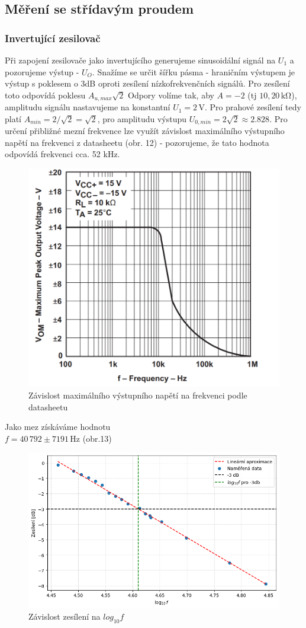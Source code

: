 \documentclass[czech,11pt,a4paper]{article}
\begin{document}
\begin{multicols}{2}
		\subsection{Měření se střídavým proudem}
		\subsubsection{Invertující zesilovač}
		Při zapojení zesilovače jako invertujícího generujeme sinusoidální signál na $U_1$ a pozorujeme výstup - $U_O$. Snažíme se určit šířku pásma - hraničním výstupem je výstup s poklesem o 3dB oproti zesílení nízkofrekvenčních signálů. Pro zesílení toto odpovídá poklesu $A_{u,max}\sqrt{2}$ Odpory volíme tak, aby $A=-2$ (tj $10,20 \,\mathrm{k\Omega}$), amplitudu signálu nastavujeme na konstantní $U_1 = 2\,\mathrm{V}$. Pro prahové zesílení tedy platí $A_{min} = 2/\sqrt{2} = \sqrt{2}$, pro amplitudu výstupu $U_{0, min} = 2\sqrt{2}\approx 2.828$. Pro určení přibližné mezní frekvence lze využít závislost maximálního výstupního napětí na frekvenci z datasheetu (obr. 12) - pozorujeme, že tato hodnota odpovídá frekvenci cca. 52 kHz.
		\begin{figure}[H]
			\centering
			\includegraphics[width=0.8\linewidth]{MSinv1}
			\caption{Závislost maximálního výstupního napětí na frekvenci podle datasheetu}
			\label{fig:msinv1}
		\end{figure}
		Jako mez získáváme hodnotu \\
		$f = 40\,792 \pm 7191 \,\mathrm{Hz}$ (obr.13)
		
		\begin{figure}[H]
			\centering
			\includegraphics[width=0.8\linewidth]{3dn}
			\caption{Závislost zesílení na $log_{10} f$}
			\label{fig:msinv1}
		\end{figure}

\end{multicols}
\end{document}
